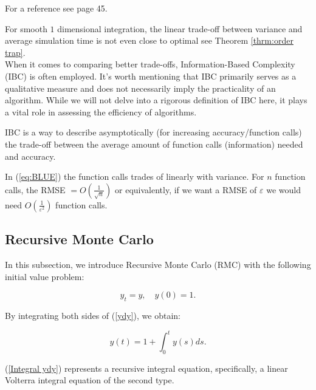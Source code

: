 \documentclass[a4paper,12pt]{article}
\begin{document}
\begin{related}
  For a reference see \cite{veach_robust_1997} page 45.
\end{related}

For smooth $1$ dimensional integration, the linear trade-off between
variance and average simulation time is not even close to optimal see
Theorem \ref{thrm:order trap}. \\
When it comes to comparing better trade-offs,
Information-Based Complexity (IBC) is often employed.
It's worth mentioning that IBC primarily serves as a
qualitative measure and does not necessarily imply the
practicality of an algorithm. While we will not delve into a
rigorous definition of IBC here, it plays a vital role in
assessing the efficiency of algorithms.

\begin{definition}
  IBC is a way to describe asymptotically (for increasing accuracy/function calls)
  the trade-off between the average amount of function calls (information)
  needed and accuracy.
\end{definition}

\begin{example}
  In (\ref{eq:BLUE}) the function calls trades of
  linearly with variance. For $n$ function calls,
  the RMSE $= O\left(\frac{1}{\sqrt{n}}\right)$ or equivalently, if we want a
  RMSE of $\varepsilon$ we would need $O\left(\frac{1}{\varepsilon^{2}}\right)$
  function calls.
\end{example}


\subsection{Recursive Monte Carlo}
In this subsection, we introduce Recursive Monte Carlo (RMC)
with the following  initial value problem:


\begin{equation} \label{ydy}
  y_t = y, \quad y(0) = 1.
\end{equation}


By integrating both sides of (\ref{ydy}), we obtain:

\begin{equation} \label{Integral ydy}
  y(t) = 1 + \int_{0}^{t} y(s) ds.
\end{equation}

(\ref{Integral ydy}) represents a recursive integral equation,
specifically, a linear Volterra integral equation of the second type.
\end{document}
